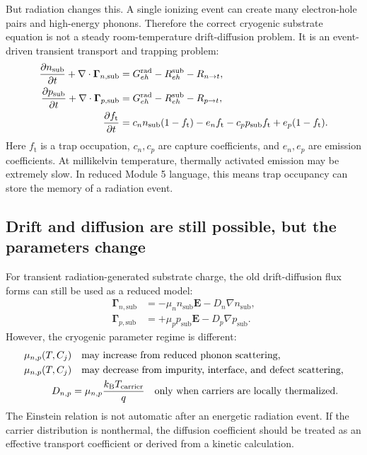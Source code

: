 \documentclass[11pt]{article}
\newcommand{\Evec}{\bm{E}}
\newcommand{\ft}{f_{\mathrm{t}}}
\begin{document}
But radiation changes this. A single ionizing event can create many electron-hole pairs and high-energy phonons. Therefore the correct cryogenic substrate equation is not a steady room-temperature drift-diffusion problem. It is an event-driven transient transport and trapping problem:
\begin{align}
\pdv{n_{\mathrm{sub}}}{t}+\nabla\cdot\bm{\Gamma}_{n,\mathrm{sub}} &= G_{eh}^{\mathrm{rad}}-R_{eh}^{\mathrm{sub}}-R_{n\to t},\\
\pdv{p_{\mathrm{sub}}}{t}+\nabla\cdot\bm{\Gamma}_{p,\mathrm{sub}} &= G_{eh}^{\mathrm{rad}}-R_{eh}^{\mathrm{sub}}-R_{p\to t},\\
\pdv{\ft}{t} &= c_n n_{\mathrm{sub}}(1-\ft)-e_n\ft-c_p p_{\mathrm{sub}}\ft+e_p(1-\ft).
\end{align}
Here \(\ft\) is a trap occupation, \(c_n,c_p\) are capture coefficients, and \(e_n,e_p\) are emission coefficients. At millikelvin temperature, thermally activated emission may be extremely slow. In reduced Module 5 language, this means trap occupancy can store the memory of a radiation event.

\subsection{Drift and diffusion are still possible, but the parameters change}

For transient radiation-generated substrate charge, the old drift-diffusion flux forms can still be used as a reduced model:
\begin{align}
\bm{\Gamma}_{n,\mathrm{sub}} &= -\mu_n n_{\mathrm{sub}}\Evec-D_n\nabla n_{\mathrm{sub}},\\
\bm{\Gamma}_{p,\mathrm{sub}} &= +\mu_p p_{\mathrm{sub}}\Evec-D_p\nabla p_{\mathrm{sub}}.
\end{align}
However, the cryogenic parameter regime is different:
\begin{align}
\mu_{n,p}(T,C_j) &\quad \text{may increase from reduced phonon scattering,}\\
\mu_{n,p}(T,C_j) &\quad \text{may decrease from impurity, interface, and defect scattering,}\\
D_{n,p} &= \mu_{n,p}\frac{k_{\mathrm{B}} T_{\mathrm{carrier}}}{q} \quad \text{only when carriers are locally thermalized.}
\end{align}
The Einstein relation is not automatic after an energetic radiation event. If the carrier distribution is nonthermal, the diffusion coefficient should be treated as an effective transport coefficient or derived from a kinetic calculation.
\end{document}

